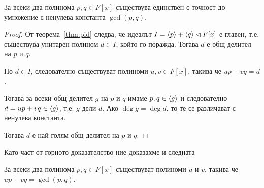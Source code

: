 \documentclass[numbers=endperiod, bibliography=totocnumbered]{scrartcl}
\begin{document}
\begin{theorem}
  За всеки два полинома \( p, q \in F[x] \) съществува единствен с точност до умножение с ненулева константа \( \gcd(p, q) \).
\end{theorem}
\begin{proof}
  От теорема~\ref{thm:pid} следва, че идеалът \( I = \left\langle p \right\rangle + \left\langle q \right\rangle \lhd F[x] \) е главен, т.е. съществува унитарен полином \( d \in I \), който го поражда.
  Тогава \( d \) е общ делител на \( p \) и \( q \).

  Но \( d \in I \), следователно съществуват полиноми \( u, v \in F[x] \), такива че \( u p + v q = d \).

  Тогава за всеки общ делител \( g \) на \( p \) и \( q \) имаме \( p, q \in \left\langle g \right\rangle \) и следователно \( d = u p + v q \in \left\langle g \right\rangle \), т.е. \( g \) дели \( d \). Ако \( \deg g = \deg d \), то те се различават с ненулева константа.

  Тогава \( d \) е най-голям общ делител на \( p \) и \( q \).
\end{proof}

Като част от горното доказателство ние доказахме и следната
\begin{theorem}
  За всеки два полинома \( p, q \in F[x] \) съществуват полиноми \( u \) и \( v \), такива че \( u p + v q = \gcd(p, q) \).
\end{theorem}
\end{document}
